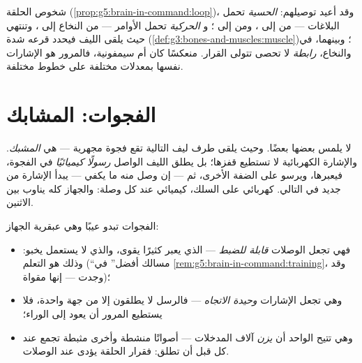 \begin{example}\label{ex:g8:nervous-communication:lines}
شخوص الحلقة (\cref{prop:g5:brain-in-command:loop})، وقد
أعيد توصيلهم: \emph{ الحسية} تحمل البلاغات ---
من  إلى ، ومن  إلى ؛
و\emph{ الحركية} تحمل الأوامر --- من النخاع إلى
، وتنتهي حيث يلقى الليف  فيحدد قرعه شدة
 (\cref{def:g3:bones-and-muscles:muscle})؛
وبينهما، في  والنخاع، \emph{ رابطة} لا تحصى
تتولى القرار. منعكسًا كان أم سيمفونية، فالمرور هو
الإشارات نفسها بمعدلات مختلفة على خطوط مختلفة.
\end{example}

\section{الفجوات: المشابك}

\begin{definition}[المشبك]\label{def:g8:nervous-communication:synapse}
 لا يلمس بعضها بعضًا. وحيث يلقى طرف ليف 
 التالية تقع فجوة مجهرية --- هي
\emph{المشبك}. والإشارة الكهربائية لا تستطيع
قفزها؛ بل يطلق الليف الواصل \emph{رسولًا كيميائيًا} في
الفجوة، فيعبرها، ويرسو على الضفة الأخرى، ثم --- إن وصل
منه ما يكفي --- يبدأ الإشارة من جديد في  التالي.
كهربائي على السلك، كيميائي عند كل وصلة: والجهاز كله
يناوب بين الاثنين.
\end{definition}

\begin{proposition}\label{prop:g8:nervous-communication:whygaps}
الفجوات تبدو عيبًا وهي عبقرية الجهاز:
\begin{itemize}
  \item فهي تجعل الوصلات \emph{قابلة للضبط} --- 
        الذي يعبر كثيرًا يقوى، والذي لا يستعمل يخبو:
        وذلك هو التعلم (``مسالك أفضل'' في
        \cref{rem:g5:brain-in-command:training}، وقد
        وجدت --- إنها  مقواة)؛
  \item وهي تجعل الإشارات \emph{وحيدة الاتجاه} ---
        فالرسل لا يطلقون إلا من جهة واحدة، فلا يستطيع
        المرور أن يعود إلى الوراء؛
  \item وهي تتيح  الواحد أن \emph{يزن} آلاف
        المدخلات --- أصواتًا منشطة وأخرى مثبطة تجمع عند
        كل  قبل أن تطلق: فقرار الحلقة يؤدى عند
        الوصلات.
\end{itemize}
\end{proposition}
\admitted

